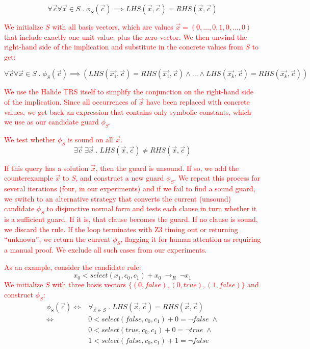 \documentclass[acmsmall,review]{acmart}\settopmatter{printfolios=true,printccs=false,printacmref=false}
\newcommand{\modified}[1]{\textcolor{red}{{#1}}}
\newcommand{\rewrites}[0]{\:\rightarrow_{R}\:}
\begin{document}
\[ \forall \vec{c} \forall \vec{x} \in S \;.\; \phi_S(\vec{c}) \implies LHS(\vec{x},\vec{c}) = RHS(\vec{x},\vec{c})
\]

\modified{We initialize $S$ with all basis vectors, which are 
values $\vec{x} = ( 0, \ldots, 0, 1, 0, \ldots, 0 )$ that include exactly one unit value,
plus the zero vector.  
We then unwind the right-hand side of the implication and substitute in the concrete values 
from $S$ to get:}

\[ \forall \vec{c} \forall \vec{x} \in S \;.\; \phi_S(\vec{c}) \implies (LHS(\vec{x_1},\vec{c}) = RHS(\vec{x_1},\vec{c}) \wedge \ldots \wedge
LHS(\vec{x_k},\vec{c}) = RHS(\vec{x_k},\vec{c}))
\]

\modified{We use the Halide TRS itself to simplify the conjunction on the right-hand side of the
implication. Since all occurrences of $\vec{x}$ have been replaced with concrete
values, we get back an expression that contains only symbolic constants, which we
use as our candidate guard $\phi_S$. }

\modified{We test whether $\phi_S$ is sound on all $\vec{x}$. }
\[ \exists \vec{c} \; \exists \vec{x} 
   \;.\; LHS(\vec{x},\vec{c}) \not= RHS(\vec{x},\vec{c})
\]

\modified{If this query has a solution $\vec{x}$, then the guard is unsound.  
If so, we add the counterexample $\vec{x}$ to $S$, and construct a new guard $\phi_S$.  
We repeat this process for several iterations (four, in our experiments) and if 
we fail to find a sound guard, we switch to an alternative strategy that converts 
the current (unsound) candidate $\phi_S$ to disjunctive normal form and tests
each clause in turn whether it is a sufficient guard.
If it is, that clause becomes the guard.  If no clause is sound, we discard the rule.
If the loop terminates with Z3 timing out or returning ``unknown'', we return
the current $\phi_S$, flagging it for human attention as requiring a manual proof. 
We exclude all such cases from our experiments.}


\modified{As an example, consider the candidate rule:}
%
\[ x_0 < select(x_1, c_0, c_1) + x_0 \rewrites \neg x_1
\]
\modified{We initialize $S$ with three basis vectors $\{(0,\mathit{false}), (0,\mathit{true}), (1,\mathit{false})\}$ and construct $\phi_S$:}
%
\begin{equation*}
\begin{split}
 \phi_S(\vec{c}) \iff 
 &  \forall_{\vec{x} \in S} \;.\; LHS(\vec{x},\vec{c}) = RHS(\vec{x},\vec{c}) \\
 \iff & 
 0 < select(\mathit{false}, c_0, c_1) + 0 = \neg\mathit{false} \; \wedge \\
                                                   & 0 < select(\mathit{true}, c_0, c_1) + 0 = \neg \mathit{true}  \; \wedge \\
                                                   & 1 < select(\mathit{false}, c_0, c_1) + 1 = \neg\mathit{false}
\end{split}
\end{equation*}
\end{document}
